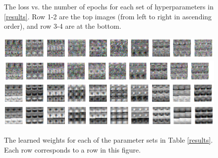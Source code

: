 \documentclass[10pt,a4paper]{article}
\begin{document}
\begin{figure}[H]
\caption{The loss vs. the number of epochs for each set of hyperparameters in \ref{results}. Row 1-2 are the top images (from left to right in ascending order), and row 3-4 are at the bottom.}
\label{lossvsepochs}
\end{figure}

\begin{figure}[H]
\includegraphics[width=15cm]{img/weights1.png}
\\
\includegraphics[width=15cm]{img/weights2.png}
\\
\includegraphics[width=15cm]{img/weights3.png}
\\
\includegraphics[width=15cm]{img/weights4.png}
\caption{The learned weights for each of the parameter sets in Table \ref{results}. Each row corresponds to a row in this figure.}
\label{weights}
\end{figure}

	
\end{document}

